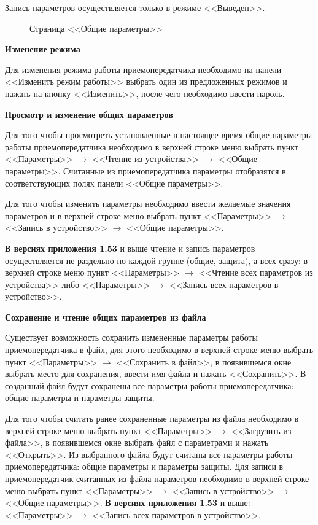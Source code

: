 Запись параметров осуществляется только в режиме <<Выведен>>. 

\begin{figure}[H]
	
	\caption{Страница <<Общие параметры>>}
	\label{fig:configurator_param_glb}
\end{figure}

\textbf{Изменение режима}

Для изменения режима работы приемопередатчика необходимо на панели <<Изменить режим работы>> выбрать один из предложенных режимов и нажать на кнопку <<Изменить>>, после чего необходимо ввести пароль.
\newline

\textbf{Просмотр и изменение общих параметров}

Для того чтобы просмотреть установленные в настоящее время общие параметры работы приемопередатчика необходимо в верхней строке меню выбрать пункт <<Параметры>> $\rightarrow$ <<Чтение из устройства>> $\rightarrow$ <<Общие параметры>>. Считанные из приемопередатчика параметры отобразятся в соответствующих полях панели <<Общие параметры>>.

Для того чтобы изменить параметры необходимо ввести желаемые значения параметров и в верхней строке меню выбрать пункт <<Параметры>> $\rightarrow$ <<Запись в устройство>> $\rightarrow$ <<Общие параметры>>.
\newline

\textbf{В версиях приложения 1.53} и выше чтение и запись параметров осуществляется не раздельно по каждой группе (общие, защита), а всех сразу: в верхней строке меню пункт <<Параметры>> $\rightarrow$ <<Чтение всех параметров из устройства>> либо <<Параметры>> $\rightarrow$ <<Запись всех параметров в устройство>>.
\newline

\textbf{Сохранение и чтение общих параметров из файла}

Существует возможность сохранить измененные параметры работы приемопередатчика в файл, для этого необходимо в верхней строке меню выбрать пункт <<Параметры>> $\rightarrow$ <<Сохранить в файл>>, в появившемся окне выбрать место для сохранения, ввести имя файла и нажать <<Сохранить>>. В созданный файл будут сохранены все параметры работы приемопередатчика: общие параметры и параметры защиты.

Для того чтобы считать ранее сохраненные параметры из файла необходимо в верхней строке меню выбрать пункт <<Параметры>> $\rightarrow$ <<Загрузить из файла>>, в появившемся окне выбрать файл с параметрами и нажать <<Открыть>>. Из выбранного файла будут считаны все параметры работы приемопередатчика: общие параметры и параметры защиты. Для записи в приемопередатчик считанных из файла параметров необходимо в верхней строке меню выбрать пункт <<Параметры>> $\rightarrow$ <<Запись в устройство>> $\rightarrow$ <<Общие параметры>>. \textbf{В версиях приложения 1.53} и выше: <<Параметры>> $\rightarrow$ <<Запись всех параметров в устройство>>.
\newline

